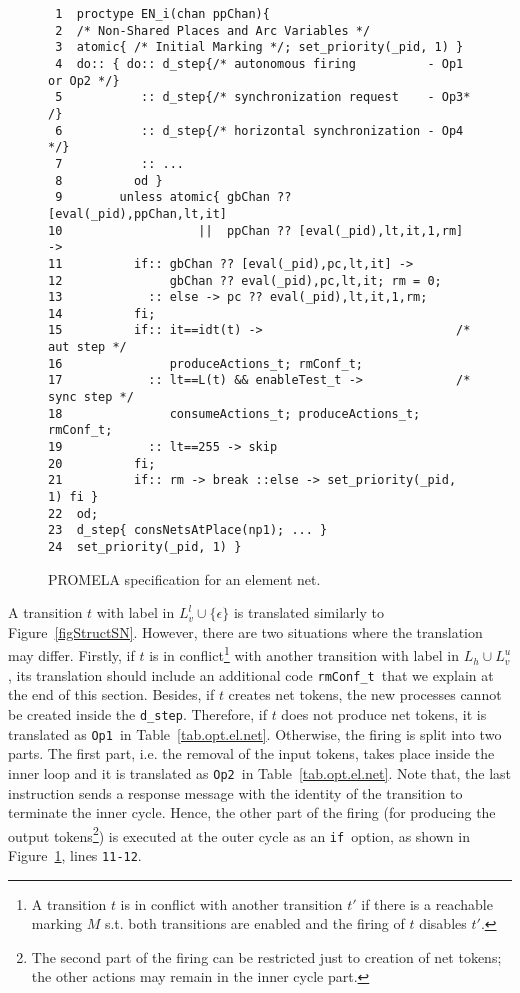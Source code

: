 \documentclass{llncs}
\begin{document}
\mfont
\begin{figure}[t!]
\begin{verbatim}
 1  proctype EN_i(chan ppChan){
 2  /* Non-Shared Places and Arc Variables */
 3  atomic{ /* Initial Marking */; set_priority(_pid, 1) }
 4  do:: { do:: d_step{/* autonomous firing          - Op1 or Op2 */}
 5           :: d_step{/* synchronization request    - Op3* /}
 6           :: d_step{/* horizontal synchronization - Op4 */}
 7           :: ...
 8          od }
 9        unless atomic{ gbChan ?? [eval(_pid),ppChan,lt,it]
10                   ||  ppChan ?? [eval(_pid),lt,it,1,rm]       ->
11          if:: gbChan ?? [eval(_pid),pc,lt,it] ->
12               gbChan ?? eval(_pid),pc,lt,it; rm = 0;
13            :: else -> pc ?? eval(_pid),lt,it,1,rm;
14          fi;
15          if:: it==idt(t) ->                           /* aut step */
16               produceActions_t; rmConf_t;
17            :: lt==L(t) && enableTest_t ->             /* sync step */
18               consumeActions_t; produceActions_t; rmConf_t;
19            :: lt==255 -> skip
20          fi;
21          if:: rm -> break ::else -> set_priority(_pid, 1) fi }
22  od;
23  d_step{ consNetsAtPlace(np1); ... }
24  set_priority(_pid, 1) }
\end{verbatim}
\vspace{-5pt}
\caption{PROMELA specification for an element net.}
\label{figStructNetEl}
\end{figure}
\nfont


A transition $t$ with label in  $L_v^l\cup \{\epsilon\}$ is translated similarly to Figure~\ref{figStructSN}. However, there are two situations where the translation may differ. Firstly, if $t$ is in conflict\footnote{ A transition $t$ is in conflict with another transition $t'$ if there is a reachable marking $M$ s.t. both transitions are enabled and the firing of $t$ disables $t'$.} with another transition with label in $L_h\cup L_v^u$, its translation should include an additional code \small\verb"rmConf_t"\nfont\ that we explain at the end of this section. Besides, if $t$ creates net tokens, the new processes cannot be created inside the \small\verb"d_step"\nfont. Therefore, if $t$ does not produce net tokens, it is translated as \small\verb"Op1"\nfont\  in Table~\ref{tab.opt.el.net}. Otherwise, the firing is split into two parts. The first part, i.e. the removal of the input tokens, takes place inside the inner loop and it is translated as \small\verb"Op2"\nfont\   in Table~\ref{tab.opt.el.net}. Note that, the last instruction sends a response message  with the identity of the transition to terminate the inner cycle. Hence, the other part of the firing (for producing the output tokens\footnote{The second part of the firing can be restricted just to creation of net tokens; the other actions may remain in the inner cycle part.}) is executed at the outer cycle as an \small\verb"if"\nfont\ option, as shown in Figure~\ref{figStructNetEl}, lines \small\verb"11-12"\nfont.
\end{document}
